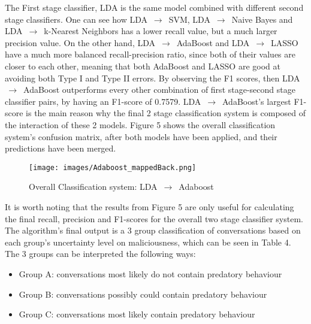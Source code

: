\documentclass[11pt]{article}
\begin{document}
The First stage classifier, LDA is the same model combined with different second stage classifiers. One can see how LDA $\,\to\,$ SVM, LDA $\,\to\,$ Naive Bayes and LDA $\,\to\,$ k-Nearest Neighbors has a lower recall value, but a much larger precision value. On the other hand, LDA $\,\to\,$ AdaBoost and LDA $\,\to\,$ LASSO have a much more balanced recall-precision ratio, since both of their values are closer to each other, meaning that both AdaBoost and LASSO are good at avoiding both Type I and Type II errors. By observing the F1 scores, then LDA $\,\to\,$ AdaBoost outperforms every other combination of first stage-second stage classifier pairs, by having an F1-score of 0.7579. LDA $\,\to\,$ AdaBoost's largest F1-score is the main reason why the final 2 stage classification  system is composed of the interaction of these 2 models. Figure 5 shows the overall classification system's confusion matrix, after both models have been applied, and their predictions have been merged.

\begin{figure}[h!]
    \centering
    \texttt{[image: images/Adaboost\_mappedBack.png]}
    \caption{Overall Classification system: LDA $\,\to\,$ Adaboost}
    \label{fig:word2vec}
\end{figure}

It is worth noting that the results from Figure 5 are only useful for calculating the final recall, precision and F1-scores for the overall two stage classifier system. The algorithm's final output is a 3 group classification of conversations based on each group's uncertainty level on maliciousness, which can be seen in Table 4. The 3 groups can be interpreted the following ways:
\begin{itemize}
        \item Group A: conversations most likely do not contain predatory behaviour
        \item Group B: conversations possibly could contain predatory behaviour
        \item Group C: conversations most likely contain predatory behaviour
\end{itemize}
\end{document}
